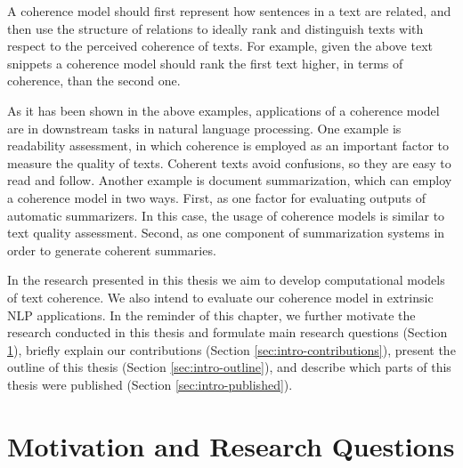 A coherence model should first represent how sentences in a text are related, and then use the structure of relations to ideally rank and distinguish texts with respect to the perceived coherence of texts. 
For example, given the above text snippets a coherence model should rank the first text higher, in terms of coherence, than the second one. 

As it has been shown in the above examples, applications of a coherence model are in downstream tasks in natural language processing. 
One example is readability assessment, in which coherence is employed as an important factor to measure the quality of texts. 
Coherent texts avoid confusions, so they are easy to read and follow. 
Another example is document summarization, which can employ a coherence model in two ways. 
First, as one factor for evaluating outputs of automatic summarizers. 
In this case, the usage of coherence models is similar to text quality assessment. 
Second, as one component of summarization systems in order to generate coherent summaries. 


In the research presented in this thesis we aim to develop computational models of text coherence. 
We also intend to evaluate our coherence model in extrinsic NLP applications. 
In the reminder of this chapter, we further motivate the research conducted in this thesis and formulate main research questions (Section \ref{sec:intro-motivation}), briefly explain our contributions (Section \ref{sec:intro-contributions}), present the outline of this thesis (Section \ref{sec:intro-outline}), and describe which parts of this thesis were published (Section \ref{sec:intro-published}). 

\section{Motivation and Research Questions}
\label{sec:intro-motivation}

